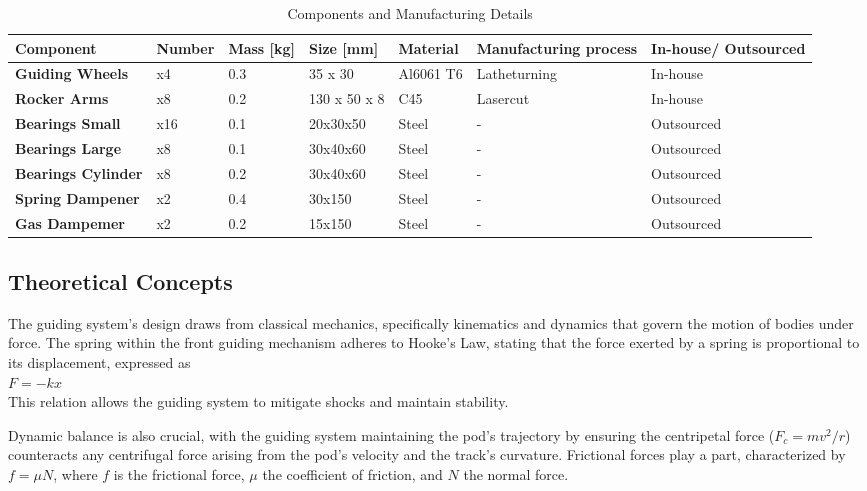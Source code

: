 \begin{table}[ht]
\centering
\label{table:components}
\begin{adjustbox}{width=\textwidth,center}
\begin{tabular}{|>{\bfseries}m{2.5cm}|m{1.4cm}|m{1.7cm}|m{2.1cm}|m{2.2cm}|m{2.6cm}|m{2.2cm}|}
\hline
Component & Number & Mass [kg] & Size [mm] & Material & Manufacturing process & In-house/ Outsourced \\
\hline
Guiding Wheels & x4 & 0.3 & 35 x 30 & Al6061 T6 & Latheturning & In-house \\
Rocker Arms & x8 & 0.2 & 130 x 50 x 8 & C45 & Lasercut & In-house \\
Bearings Small& x16 & 0.1 & 20x30x50 & Steel & -&  Outsourced  \\
Bearings Large & x8 & 0.1 & 30x40x60 & Steel & -& Outsourced \\
Bearings Cylinder & x8 & 0.2 & 30x40x60 & Steel & -& Outsourced \\
Spring Dampener & x2 & 0.4 & 30x150 & Steel & -& Outsourced \\
Gas Dampemer & x2 & 0.2 & 15x150 & Steel & -& Outsourced \\

\hline
\end{tabular}
\end{adjustbox}
\caption{Components and Manufacturing Details}
\end{table}

\subsection{Theoretical Concepts}

The guiding system's design draws from classical mechanics, specifically kinematics and dynamics that govern the motion of bodies under force. The spring within the front guiding mechanism adheres to Hooke's Law, stating that the force exerted by a spring is proportional to its displacement, expressed as\\
 \( F = -kx \)\\
 This relation allows the guiding system to mitigate shocks and maintain stability.

Dynamic balance is also crucial, with the guiding system maintaining the pod's trajectory by ensuring the centripetal force (\( F_c = mv^2/r \)) counteracts any centrifugal force arising from the pod's velocity and the track's curvature. Frictional forces play a part, characterized by \( f = \mu N \), where \( f \) is the frictional force, \( \mu \) the coefficient of friction, and \( N \) the normal force.

